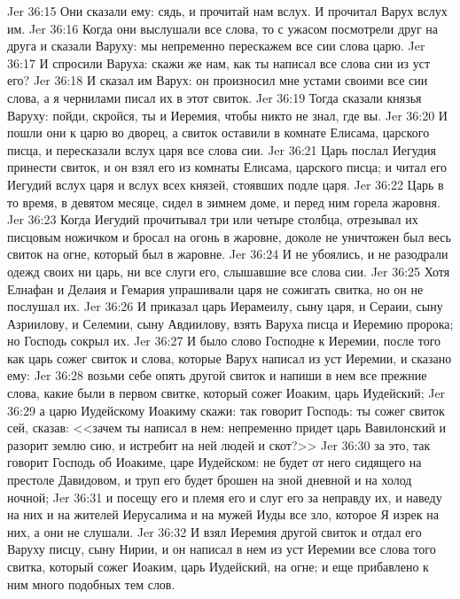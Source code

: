 \vs Jer 36:15 Они сказали ему: сядь, и прочитай нам вслух. И прочитал Варух вслух им.
\vs Jer 36:16 Когда они выслушали все слова, то с ужасом посмотрели друг на друга и сказали Варуху: мы непременно перескажем все сии слова царю.
\vs Jer 36:17 И спросили Варуха: скажи же нам, как ты написал все слова сии из уст его?
\vs Jer 36:18 И сказал им Варух: он произносил мне устами своими все сии слова, а я чернилами писал их в этот свиток.
\vs Jer 36:19 Тогда сказали князья Варуху: пойди, скройся, ты и Иеремия, чтобы никто не знал, где вы.
\vs Jer 36:20 И пошли они к царю во дворец, а свиток оставили в комнате Елисама, царского писца, и пересказали вслух царя все слова сии.
\vs Jer 36:21 Царь послал Иегудия принести свиток, и он взял его из комнаты Елисама, царского писца; и читал его Иегудий вслух царя и вслух всех князей, стоявших подле царя.
\vs Jer 36:22 Царь в то время, в девятом месяце, сидел в зимнем доме, и перед ним горела жаровня.
\vs Jer 36:23 Когда Иегудий прочитывал три или четыре столбца,  отрезывал их писцовым ножичком и бросал на огонь в жаровне, доколе не уничтожен был весь свиток на огне, который был в жаровне.
\vs Jer 36:24 И не убоялись, и не разодрали одежд своих ни царь, ни все слуги его, слышавшие все слова сии.
\vs Jer 36:25 Хотя Елнафан и Делаия и Гемария упрашивали царя не сожигать свитка, но он не послушал их.
\vs Jer 36:26 И приказал царь Иерамеилу, сыну царя, и Сераии, сыну Азриилову, и Селемии, сыну Авдиилову, взять Варуха писца и Иеремию пророка; но Господь сокрыл их.
\rsbpar\vs Jer 36:27 И было слово Господне к Иеремии, после того как царь сожег свиток и слова, которые Варух написал из уст Иеремии, и сказано ему:
\vs Jer 36:28 возьми себе опять другой свиток и напиши в нем все прежние слова, какие были в первом свитке, который сожег Иоаким, царь Иудейский;
\vs Jer 36:29 а царю Иудейскому Иоакиму скажи: так говорит Господь: ты сожег свиток сей, сказав: <<зачем ты написал в нем: непременно придет царь Вавилонский и разорит землю сию, и истребит на ней людей и скот?>>
\vs Jer 36:30 за это, так говорит Господь об Иоакиме, царе Иудейском: не будет от него сидящего на престоле Давидовом, и труп его будет брошен на зной дневной и на холод ночной;
\vs Jer 36:31 и посещу его и племя его и слуг его за неправду их, и наведу на них и на жителей Иерусалима и на мужей Иуды все зло, которое Я изрек на них, а они не слушали.
\vs Jer 36:32 И взял Иеремия другой свиток и отдал его Варуху писцу, сыну Нирии, и он написал в нем из уст Иеремии все слова того свитка, который сожег Иоаким, царь Иудейский, на огне; и еще прибавлено к ним много подобных тем слов.
